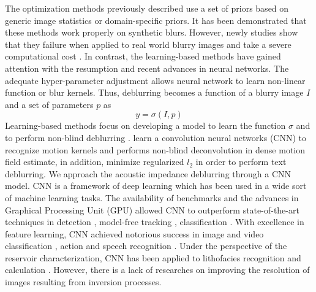 \documentclass[conference,compsoc]{IEEEtran}
\begin{document}
The optimization methods previously described use a set of priors based on
generic image statistics or domain-specific priors. It has been demonstrated
that these methods work properly on synthetic blurs. However, newly studies show that they failure
when applied to real world blurry images \cite{Lai2016} and take a severe computational cost \cite{Chakrabarti2016}.
In contrast, the learning-based methods have gained attention with the resumption and recent advances in neural
networks. The adequate hyper-parameter adjustment allows neural network to learn
non-linear function or blur kernels. Thus, deblurring becomes a function of a blurry image $I$
and a set of parameters $p$ as
\begin{equation}
 y = \sigma(I,p)
 \label{eq:deblur}
\end{equation}
Learning-based methods focus on developing a model to learn the function $\sigma$ \cite{Hradis2015}
and to perform non-blind deblurring \cite{Chakrabarti2016}. \cite{Sun2015} learn a convolution neural networks (CNN) to
recognize motion kernels and performs non-blind deconvolution in
dense motion field estimate, in addition, \cite{Hradis2015} minimize regularized $l_2$ 
in order to perform text deblurring.
We approach  the acoustic impedance deblurring through
a CNN model. CNN is a framework of deep learning which has been
used in a wide sort of machine learning tasks. The availability of benchmarks
\cite{Russakovsky} and the advances in Graphical Processing Unit (GPU) \cite{Buduma15}
allowed CNN to outperform state-of-the-art techniques in detection \cite{Girshick,Bell}, model-free
tracking \cite{Nam}, classification \cite{He}. With excellence in feature learning,
CNN achieved notorious success in image and video classification \cite{Krizhevsky, AbdelHamid}, action  and speech recognition \cite{Farfade, S_Ji}.
Under the perspective of the reservoir characterization, CNN has been applied to lithofacies recognition
\cite{qian} and calculation \cite{Liu}. However, there is a lack of researches on improving the resolution of
images resulting from inversion processes.
\end{document}
